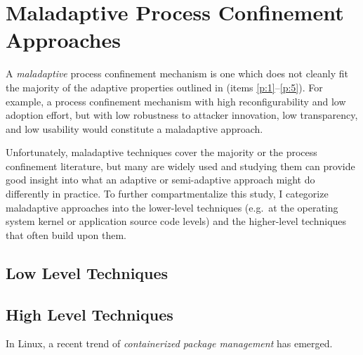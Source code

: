 \documentclass[dvipsnames, 12pt]{article}
\begin{document}
\section{Maladaptive Process Confinement Approaches}
\label{sec:maladaptive}

A \textit{maladaptive} process confinement mechanism is one which does not
cleanly fit the majority of the adaptive properties outlined in
 (items \ref{p:1}--\ref{p:5}). For example, a process
confinement mechanism with high reconfigurability and low adoption effort, but
with low robustness to attacker innovation, low transparency, and low usability
would constitute a maladaptive approach.

Unfortunately, maladaptive techniques cover the majority or the process
confinement literature, but many are widely used and studying them can provide
good insight into what an adaptive or semi-adaptive approach might do
differently in practice. To further compartmentalize this study, I categorize
maladaptive approaches into the lower-level techniques (e.g.~at the operating
system kernel or application source code levels) and the higher-level techniques
that often build upon them.

\subsection{Low Level Techniques}



\subsection{High Level Techniques}

In Linux, a recent trend of \textit{containerized package management} has emerged.
\end{document}
